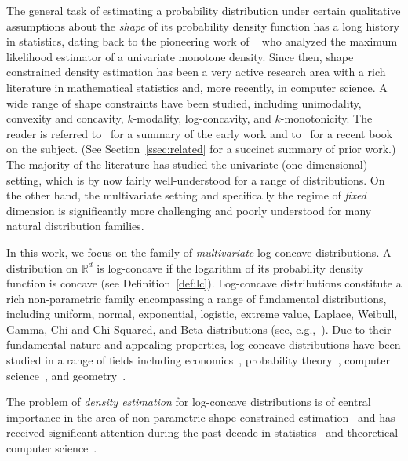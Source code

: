 \documentclass[final,12pt]{colt2018}
\newtheorem{informal theorem}[theorem]{Theorem (informal statement)}
\newcommand{\R}{\mathbb{R}}
\begin{document}
The general task of estimating a probability distribution under certain 
qualitative assumptions about the {\em shape} of its probability density function
has a long history in statistics, dating back to the pioneering work of %
~\cite{Grenander:56} 
who analyzed the maximum likelihood estimator of a univariate monotone density. 
Since then, shape constrained density estimation has been a very active research area 
with a rich literature in mathematical statistics and, more recently, in computer science. 
A wide range of shape constraints have been studied, including unimodality, convexity and concavity, 
$k$-modality, log-concavity, and $k$-monotonicity.
The reader is referred to~\cite{BBBB:72} for a summary of the early work and to~\cite{GJ:14} 
for a recent book on the subject. (See Section~\ref{ssec:related} for a succinct summary of prior work.)
The majority of the literature has studied the univariate (one-dimensional) setting, 
which is by now fairly well-understood for a range of distributions. On the other hand,
the multivariate setting and specifically the regime of {\em fixed} dimension is significantly more
challenging and poorly understood for many natural distribution families.

In this work, we focus on the family of {\em multivariate} log-concave distributions. A distribution on $\R^d$
is log-concave if the logarithm of its probability density function is concave (see Definition~\ref{def:lc}).
Log-concave distributions constitute a rich non-parametric family
encompassing a range of fundamental distributions, including
uniform, normal, exponential, logistic, extreme value,
Laplace, Weibull, Gamma, Chi and Chi-Squared, and Beta distributions (see, e.g.,~\cite{BagnoliBergstrom05}).
Due to their fundamental nature and appealing properties,
log-concave distributions have been studied in a range of fields including
economics~\cite{An:95}, probability theory~\cite{SW14-survey},
computer science~\cite{LV07}, and geometry~\cite{Stanley:89}.

The problem of {\em density estimation} for log-concave distributions is of central importance
in the area of non-parametric shape constrained estimation~\cite{Walther09, SW14-survey, Sam17-survey}
and has received significant attention during the past decade in statistics~\cite{Cule10a, 
DumbgenRufibach:09, DossW16, ChenSam13, KimSam16, BalDoss14, HW16} 
and theoretical computer science~\cite{CDSS13, CDSS14, ADLS17, CanonneDGR16, DKS16-proper-lc, DiakonikolasKS17-lc}.
\end{document}
